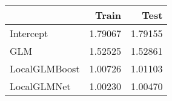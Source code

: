 \begin{tabular}{lrr}
\toprule
{} &    Train &     Test \\
\midrule
Intercept     &  1.79067 &  1.79155 \\
GLM           &  1.52525 &  1.52861 \\
LocalGLMBoost &  1.00726 &  1.01103 \\
LocalGLMNet   &  1.00230 &  1.00470 \\
\bottomrule
\end{tabular}

